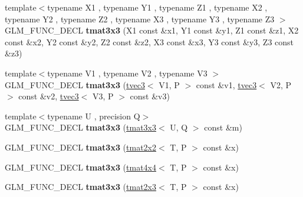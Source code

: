 \begin{DoxyCompactItemize}
\item 
\hypertarget{structglm_1_1detail_1_1tmat3x3_a9231c5d0ebe3a535d602e4135b9019c2}{{\footnotesize template$<$typename X1 , typename Y1 , typename Z1 , typename X2 , typename Y2 , typename Z2 , typename X3 , typename Y3 , typename Z3 $>$ }\\G\-L\-M\-\_\-\-F\-U\-N\-C\-\_\-\-D\-E\-C\-L {\bfseries tmat3x3} (X1 const \&x1, Y1 const \&y1, Z1 const \&z1, X2 const \&x2, Y2 const \&y2, Z2 const \&z2, X3 const \&x3, Y3 const \&y3, Z3 const \&z3)}\label{structglm_1_1detail_1_1tmat3x3_a9231c5d0ebe3a535d602e4135b9019c2}

\item 
\hypertarget{structglm_1_1detail_1_1tmat3x3_aa698f62dc4eafac9096370495dc6f74c}{{\footnotesize template$<$typename V1 , typename V2 , typename V3 $>$ }\\G\-L\-M\-\_\-\-F\-U\-N\-C\-\_\-\-D\-E\-C\-L {\bfseries tmat3x3} (\hyperlink{structglm_1_1detail_1_1tvec3}{tvec3}$<$ V1, P $>$ const \&v1, \hyperlink{structglm_1_1detail_1_1tvec3}{tvec3}$<$ V2, P $>$ const \&v2, \hyperlink{structglm_1_1detail_1_1tvec3}{tvec3}$<$ V3, P $>$ const \&v3)}\label{structglm_1_1detail_1_1tmat3x3_aa698f62dc4eafac9096370495dc6f74c}

\item 
\hypertarget{structglm_1_1detail_1_1tmat3x3_a167e0a30ab00a30c1f3e7c528a8f4aee}{{\footnotesize template$<$typename U , precision Q$>$ }\\G\-L\-M\-\_\-\-F\-U\-N\-C\-\_\-\-D\-E\-C\-L {\bfseries tmat3x3} (\hyperlink{structglm_1_1detail_1_1tmat3x3}{tmat3x3}$<$ U, Q $>$ const \&m)}\label{structglm_1_1detail_1_1tmat3x3_a167e0a30ab00a30c1f3e7c528a8f4aee}

\item 
\hypertarget{structglm_1_1detail_1_1tmat3x3_a421b7ee49440a7e1f0a576895f6e6363}{G\-L\-M\-\_\-\-F\-U\-N\-C\-\_\-\-D\-E\-C\-L {\bfseries tmat3x3} (\hyperlink{structglm_1_1detail_1_1tmat2x2}{tmat2x2}$<$ T, P $>$ const \&x)}\label{structglm_1_1detail_1_1tmat3x3_a421b7ee49440a7e1f0a576895f6e6363}

\item 
\hypertarget{structglm_1_1detail_1_1tmat3x3_a38cd720277c46b3768db3318960649d3}{G\-L\-M\-\_\-\-F\-U\-N\-C\-\_\-\-D\-E\-C\-L {\bfseries tmat3x3} (\hyperlink{structglm_1_1detail_1_1tmat4x4}{tmat4x4}$<$ T, P $>$ const \&x)}\label{structglm_1_1detail_1_1tmat3x3_a38cd720277c46b3768db3318960649d3}

\item 
\hypertarget{structglm_1_1detail_1_1tmat3x3_a41ebff3cc8fb20c2e47684333186d1db}{G\-L\-M\-\_\-\-F\-U\-N\-C\-\_\-\-D\-E\-C\-L {\bfseries tmat3x3} (\hyperlink{structglm_1_1detail_1_1tmat2x3}{tmat2x3}$<$ T, P $>$ const \&x)}\label{structglm_1_1detail_1_1tmat3x3_a41ebff3cc8fb20c2e47684333186d1db}


\end{DoxyCompactItemize}

